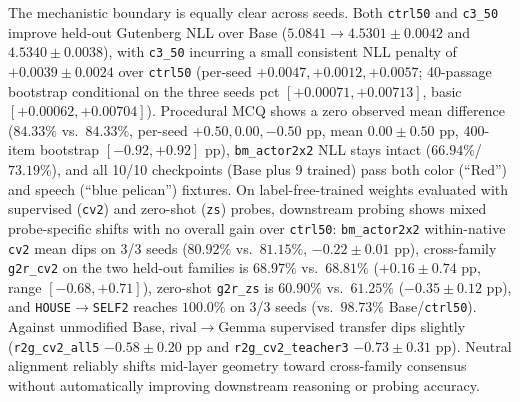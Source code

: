 \documentclass[conference]{IEEEtran}
\begin{document}
The mechanistic boundary is equally clear across seeds. Both \texttt{ctrl50} and \texttt{c3\_50} improve held-out Gutenberg NLL over Base ($5.0841\to4.5301\pm0.0042$ and $4.5340\pm0.0038$), with \texttt{c3\_50} incurring a small consistent NLL penalty of $+0.0039\pm0.0024$ over \texttt{ctrl50} (per-seed $+0.0047, +0.0012, +0.0057$; 40-passage bootstrap conditional on the three seeds pct $[+0.00071, +0.00713]$, basic $[+0.00062, +0.00704]$). Procedural MCQ shows a zero observed mean difference ($84.33\%$ vs.\ $84.33\%$, per-seed $+0.50, 0.00, -0.50$ pp, mean $0.00\pm0.50$ pp, 400-item bootstrap $[-0.92, +0.92]$ pp), \texttt{bm\_actor2x2} NLL stays intact ($66.94\%$/$73.19\%$), and all 10/10 checkpoints (Base plus 9 trained) pass both color (``Red'') and speech (``blue pelican'') fixtures. On label-free-trained weights evaluated with supervised (\texttt{cv2}) and zero-shot (\texttt{zs}) probes, downstream probing shows mixed probe-specific shifts with no overall gain over \texttt{ctrl50}: \texttt{bm\_actor2x2} within-native \texttt{cv2} mean dips on 3/3 seeds ($80.92\%$ vs.\ $81.15\%$, $-0.22\pm0.01$ pp), cross-family \texttt{g2r\_cv2} on the two held-out families is $68.97\%$ vs.\ $68.81\%$ ($+0.16\pm0.74$ pp, range $[-0.68, +0.71]$), zero-shot \texttt{g2r\_zs} is $60.90\%$ vs.\ $61.25\%$ ($-0.35\pm0.12$ pp), and \texttt{HOUSE}$\to$\texttt{SELF2} reaches $100.0\%$ on 3/3 seeds (vs.\ $98.73\%$ Base/\texttt{ctrl50}). Against unmodified Base, rival$\to$Gemma supervised transfer dips slightly (\texttt{r2g\_cv2\_all5} $-0.58\pm0.20$ pp and \texttt{r2g\_cv2\_teacher3} $-0.73\pm0.31$ pp). Neutral alignment reliably shifts mid-layer geometry toward cross-family consensus without automatically improving downstream reasoning or probing accuracy.
\end{document}
